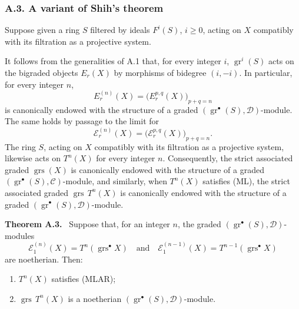 \documentclass[11pt]{article}
\newenvironment{statement}[1]{\par\medskip\noindent\textbf{#1.}\ }{\par\medskip}
\providecommand{\gr}{\operatorname{gr}}
\providecommand{\gr}{\operatorname{gr}}
\providecommand{\gr}{\operatorname{gr}}
\providecommand{\grs}{\operatorname{grs}}
\begin{document}
\subsubsection*{A.3. A variant of Shih's theorem}
Suppose given a ring \(S\) filtered by ideals \(F^i(S)\), \(i\ge0\), acting on \(X\) compatibly with its filtration as a projective system.

It follows from the generalities of A.1 that, for every integer \(i\), \(\gr^i(S)\) acts on the bigraded objects \(E_r(X)\) by morphisms of bidegree \((i,-i)\). In particular, for every integer \(n\),
\[
E_r^{(n)}(X)=\bigl(E_r^{p,q}(X)\bigr)_{p+q=n}
\]
is canonically endowed with the structure of a graded \((\gr^\bullet(S),\mathcal D)\)-module. The same holds by passage to the limit for
\[
\mathcal E_r^{(n)}(X)=\bigl(\mathcal E_r^{p,q}(X)\bigr)_{p+q=n}.
\]
The ring \(S\), acting on \(X\) compatibly with its filtration as a projective system, likewise acts on \(T^n(X)\) for every integer \(n\). Consequently, the strict associated graded \(\grs(X)\) is canonically endowed with the structure of a graded \((\gr^\bullet(S),\mathcal C)\)-module, and similarly, when \(T^n(X)\) satisfies (ML), the strict associated graded \(\grs\,T^n(X)\) is canonically endowed with the structure of a graded \((\gr^\bullet(S),\mathcal D)\)-module.

\begin{statement}{Theorem A.3}
Suppose that, for an integer \(n\), the graded \((\gr^\bullet(S),\mathcal D)\)-modules
\[
\mathcal E_1^{(n)}(X)=T^n(\grs^\bullet X)
\quad\text{and}\quad
\mathcal E_1^{(n-1)}(X)=T^{n-1}(\grs^\bullet X)
\]
are noetherian. Then:
\begin{enumerate}[label=\textup{(\roman*)}]
\item \(T^n(X)\) satisfies (MLAR);
\item \(\grs\,T^n(X)\) is a noetherian \((\gr^\bullet(S),\mathcal D)\)-module.
\end{enumerate}
\end{statement}
\end{document}
